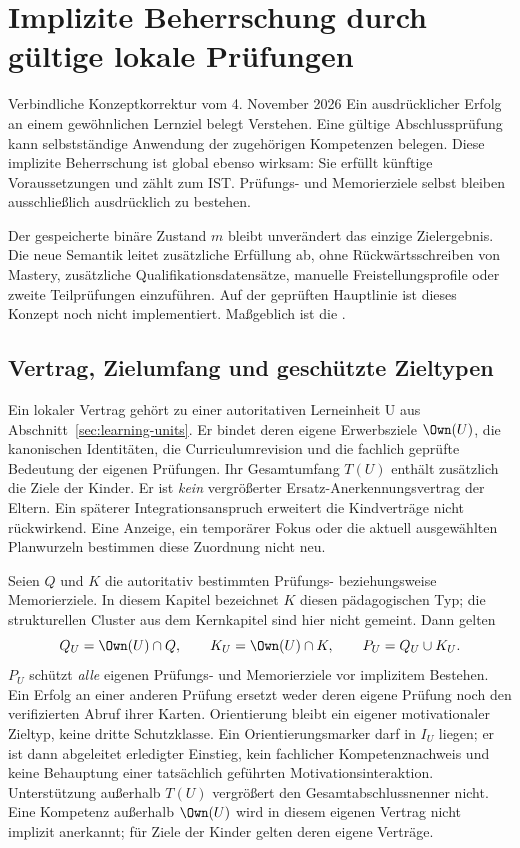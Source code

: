 \section{Implizite Beherrschung durch gültige lokale Prüfungen}
\label{sec:assessment}
\begin{principle}{Verbindliche Konzeptkorrektur vom 4. November 2026}
Ein ausdrücklicher Erfolg an einem gewöhnlichen Lernziel belegt Verstehen.
Eine gültige Abschlussprüfung kann selbstständige Anwendung der zugehörigen
Kompetenzen belegen. Diese implizite Beherrschung ist global ebenso wirksam:
Sie erfüllt künftige Voraussetzungen und zählt zum IST. Prüfungs- und
Memorierziele selbst bleiben ausschließlich ausdrücklich zu bestehen.
\end{principle}

Der gespeicherte binäre Zustand $m$ bleibt unverändert das einzige
Zielergebnis. Die neue Semantik leitet zusätzliche Erfüllung ab, ohne
Rückwärtsschreiben von Mastery, zusätzliche Qualifikationsdatensätze,
manuelle Freistellungsprofile oder zweite Teilprüfungen einzuführen.
Auf der geprüften Hauptlinie ist dieses Konzept noch nicht implementiert.
Maßgeblich ist die
.

\subsection{Vertrag, Zielumfang und geschützte Zieltypen}
Ein lokaler Vertrag gehört zu einer autoritativen Lerneinheit U aus
Abschnitt~\ref{sec:learning-units}. Er bindet deren eigene Erwerbsziele
$\Own(U)$, die kanonischen Identitäten, die Curriculumrevision und die
fachlich geprüfte Bedeutung der eigenen Prüfungen. Ihr Gesamtumfang
$T(U)$ enthält zusätzlich die Ziele der Kinder. Er ist \emph{kein}
vergrößerter Ersatz-Anerkennungsvertrag der Eltern. Ein späterer
Integrationsanspruch erweitert die Kindverträge nicht rückwirkend.
Eine Anzeige, ein temporärer Fokus oder die aktuell ausgewählten Planwurzeln
bestimmen diese Zuordnung nicht neu.

Seien $Q$ und $K$ die autoritativ bestimmten Prüfungs- beziehungsweise
Memorierziele. In diesem Kapitel bezeichnet $K$ diesen pädagogischen Typ;
die strukturellen Cluster aus dem Kernkapitel sind hier nicht gemeint.
Dann gelten
\[
 Q_U=\Own(U)\cap Q,\qquad K_U=\Own(U)\cap K,\qquad P_U=Q_U\cup K_U.
\]
$P_U$ schützt \emph{alle} eigenen Prüfungs- und Memorierziele vor
implizitem Bestehen. Ein Erfolg an einer anderen Prüfung ersetzt weder
deren eigene Prüfung noch den verifizierten Abruf ihrer Karten.
Orientierung bleibt ein eigener motivationaler Zieltyp, keine dritte
Schutzklasse. Ein Orientierungsmarker darf in $I_U$ liegen; er ist dann
abgeleitet erledigter Einstieg, kein fachlicher Kompetenznachweis und
keine Behauptung einer tatsächlich geführten Motivationsinteraktion.
Unterstützung außerhalb $T(U)$ vergrößert den Gesamtabschlussnenner nicht.
Eine Kompetenz außerhalb $\Own(U)$ wird in diesem eigenen Vertrag nicht
implizit anerkannt; für Ziele der Kinder gelten deren eigene Verträge.

